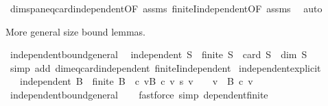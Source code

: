 \begin{isabellebody}
%
\isatagproof
{}\isamarkupfalse%
\ dim{\isacharunderscore}{\kern0pt}span{\isacharunderscore}{\kern0pt}eq{\isacharunderscore}{\kern0pt}card{\isacharunderscore}{\kern0pt}independent{\isacharbrackleft}{\kern0pt}OF\ assms{\isacharbrackright}{\kern0pt}\ finiteI{\isacharunderscore}{\kern0pt}independent{\isacharbrackleft}{\kern0pt}OF\ assms{\isacharbrackright}{\kern0pt}\ \isamarkupfalse%
\ auto%
\endisatagproof
{\isafoldproof}%
%
\isadelimproof
%
\endisadelimproof
%
\begin{isamarkuptext}%
More general size bound lemmas.%
\end{isamarkuptext}\isamarkuptrue%
\isamarkupfalse%
\ independent{\isacharunderscore}{\kern0pt}bound{\isacharunderscore}{\kern0pt}general{\isacharcolon}{\kern0pt}\isanewline
\ \ {\isachardoublequoteopen}independent\ S\ {\isasymLongrightarrow}\ finite\ S\ {\isasymand}\ card\ S\ {\isasymle}\ dim\ S{\isachardoublequoteclose}\isanewline
%
\isadelimproof
\ \ %
\endisadelimproof
%
\isatagproof
{}\isamarkupfalse%
\ {\isacharparenleft}{\kern0pt}simp\ add{\isacharcolon}{\kern0pt}\ dim{\isacharunderscore}{\kern0pt}eq{\isacharunderscore}{\kern0pt}card{\isacharunderscore}{\kern0pt}independent\ finiteI{\isacharunderscore}{\kern0pt}independent{\isacharparenright}{\kern0pt}%
\endisatagproof
{\isafoldproof}%
%
\isadelimproof
\isanewline
%
\endisadelimproof
\isanewline
{}\isamarkupfalse%
\ independent{\isacharunderscore}{\kern0pt}explicit{\isacharcolon}{\kern0pt}\isanewline
\ \ \ {\isachardoublequoteopen}independent\ B\ {\isasymlongleftrightarrow}\ finite\ B\ {\isasymand}\ {\isacharparenleft}{\kern0pt}{\isasymforall}c{\isachardot}{\kern0pt}\ {\isacharparenleft}{\kern0pt}{\isasymSum}v{\isasymin}B{\isachardot}{\kern0pt}\ c\ v\ {\isacharasterisk}{\kern0pt}s\ v{\isacharparenright}{\kern0pt}\ {\isacharequal}{\kern0pt}\ {}\ {\isasymlongrightarrow}\ {\isacharparenleft}{\kern0pt}{\isasymforall}v\ {\isasymin}\ B{\isachardot}{\kern0pt}\ c\ v\ {\isacharequal}{\kern0pt}\ {}{\isacharparenright}{\kern0pt}{\isacharparenright}{\kern0pt}{\isachardoublequoteclose}\isanewline
%
\isadelimproof
\ \ %
\endisadelimproof
%
\isatagproof
{}\isamarkupfalse%
\ independent{\isacharunderscore}{\kern0pt}bound{\isacharunderscore}{\kern0pt}general\isanewline
\ \ \isamarkupfalse%
\ {\isacharparenleft}{\kern0pt}fastforce\ simp{\isacharcolon}{\kern0pt}\ dependent{\isacharunderscore}{\kern0pt}finite{\isacharparenright}{\kern0pt}%
\endisatagproof
{\isafoldproof}%
%
\isadelimproof

\end{isabellebody}

